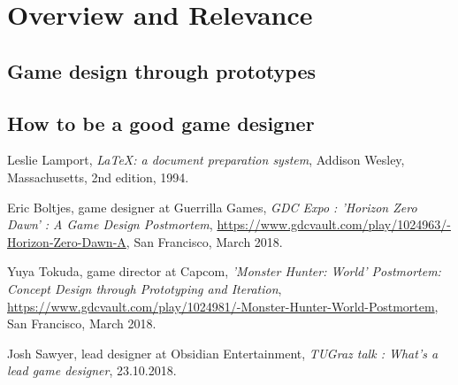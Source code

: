 \documentclass[a4paper]{article}
\begin{document}
\section{Overview and Relevance}


\subsection{Game design through prototypes}
\subsection{How to be a good game designer}

\renewcommand{\refname}{\section{References and Further Sources}}
\begin{thebibliography}{1}

  Leslie Lamport,
  \emph{\LaTeX: a document preparation system},
  Addison Wesley, Massachusetts,
  2nd edition,
  1994.

  Eric Boltjes, game designer at Guerrilla Games,
  \emph{GDC Expo : ’Horizon Zero Dawn’ : A Game Design Postmortem},
  \url{https://www.gdcvault.com/play/1024963/-Horizon-Zero-Dawn-A},
  San Francisco,
  March 2018.

  Yuya Tokuda, game director at Capcom,
  \emph{'Monster Hunter: World' Postmortem: Concept Design through Prototyping and Iteration},
  \url{https://www.gdcvault.com/play/1024981/-Monster-Hunter-World-Postmortem},
  San Francisco,
  March 2018.

  Josh Sawyer, lead designer at Obsidian Entertainment,
  \emph{TUGraz talk : What's a lead game designer},
  23.10.2018.

\end{thebibliography}
\end{document}
